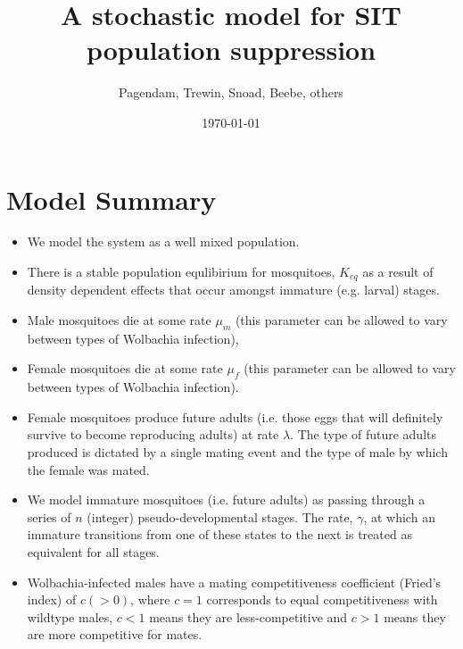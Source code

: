 \documentclass[]{article}  %
\begin{document}
\title{A stochastic model for SIT population suppression}   %
\author{Pagendam, Trewin, Snoad, Beebe, others}
\date{\today}    %
\maketitle

\section{Model Summary}

\begin{itemize}
\item We model the system as a well mixed population.
\item There is a stable population equlibirium for mosquitoes, $K_{eq}$ as a result of density dependent effects that occur amongst immature (e.g. larval) stages.
\item Male mosquitoes die at some rate $\mu_m$ (this parameter can be allowed to vary between types of Wolbachia infection),
\item Female mosquitoes die at some rate $\mu_f$ (this parameter can be allowed to vary between types of Wolbachia infection).
\item Female mosquitoes produce future adults (i.e. those eggs that will definitely survive to become reproducing adults) at rate $\lambda$.  The type of future adults produced is dictated by a single mating event and the type of male by which the female was mated.
\item We model immature mosquitoes (i.e. future adults) as passing through a series of $n$ (integer) pseudo-developmental stages.  The rate, $\gamma$, at which an immature transitions from one of these states to the next is treated as equivalent for all stages.
\item Wolbachia-infected males have a mating competitiveness coefficient (Fried's index) of $c (> 0)$, where $c=1$ corresponds to equal competitiveness with wildtype males, $c < 1$ means they are less-competitive and $c > 1$ means they are more competitive for mates.
\end{itemize}
\end{document}
